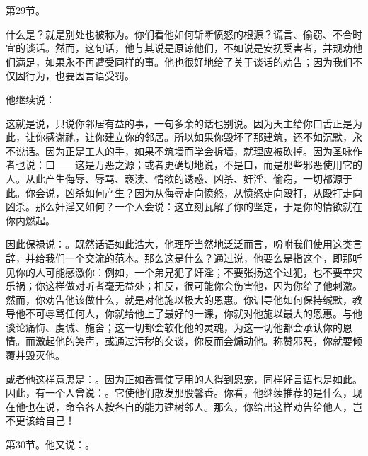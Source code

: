 第29节。\par

什么是？就是别处也被称为。你们看他如何斩断愤怒的根源？谎言、偷窃、不合时宜的谈话。然而，这句话，他与其说是原谅他们，不如说是安抚受害者，并规劝他们满足，如果永不再遭受同样的事。他也很好地给了关于谈话的劝告；因为我们不仅因行为，也要因言语受罚。\par

他继续说：\par

这就是说，只说你邻居有益的事，一句多余的话也别说。因为天主给你口舌正是为此，让你感谢祂，让你建立你的邻居。所以如果你毁坏了那建筑，还不如沉默，永不说话。因为正是工人的手，如果不筑墙而学会拆墙，就理应被砍掉。因为圣咏作者也说：口——这是万恶之源；或者更确切地说，不是口，而是那些邪恶使用它的人。从此产生侮辱、辱骂、亵渎、情欲的诱惑、凶杀、奸淫、偷窃，一切都源于此。你会说，凶杀如何产生？因为从侮辱走向愤怒，从愤怒走向殴打，从殴打走向凶杀。那么奸淫又如何？一个人会说：这立刻瓦解了你的坚定，于是你的情欲就在你内燃起。\par

因此保禄说：。既然话语如此浩大，他理所当然地泛泛而言，吩咐我们使用这类言辞，并给我们一个交流的范本。那么这是什么？通过说，他要么是指这个，即那听见你的人可能感激你：例如，一个弟兄犯了奸淫；不要张扬这个过犯，也不要幸灾乐祸；你这样做对听者毫无益处；相反，很可能你会伤害他，因为你给了他刺激。然而，你劝告他该做什么，就是对他施以极大的恩惠。你训导他如何保持缄默，教导他不可辱骂任何人，你就给他上了最好的一课，你就对他施以最大的恩惠。与他谈论痛悔、虔诚、施舍；这一切都会软化他的灵魂，为这一切他都会承认你的恩情。而激起他的笑声，或通过污秽的交谈，你反而会煽动他。称赞邪恶，你就要倾覆并毁灭他。\par

或者他这样意思是：。因为正如香膏使享用的人得到恩宠，同样好言语也是如此。因此，有一个人曾说：。它使他们散发那股馨香。你看，他继续推荐的是什么，现在他也在说，命令各人按各自的能力建树邻人。那么，你给出这样劝告给他人，岂不更该给自己！\par

第30节。他又说：。\par

